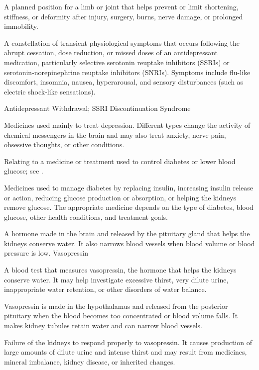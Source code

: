  A planned position for a limb or joint that helps prevent or limit shortening, stiffness, or deformity after injury, surgery, burns, nerve damage, or prolonged immobility.

 A constellation of transient physiological symptoms that occurs following the abrupt cessation, dose reduction, or missed doses of an antidepressant medication, particularly selective serotonin reuptake inhibitors (SSRIs) or serotonin-norepinephrine reuptake inhibitors (SNRIs). Symptoms include flu-like discomfort, insomnia, nausea, hyperarousal, and sensory disturbances (such as electric shock-like sensations).

\synonyms
Antidepressant Withdrawal; SSRI Discontinuation Syndrome

 Medicines used mainly to treat depression. Different types change the activity of chemical messengers in the brain and may also treat anxiety, nerve pain, obsessive thoughts, or other conditions.

 Relating to a medicine or treatment used to control diabetes or lower blood glucose; see .

 Medicines used to manage diabetes by replacing insulin, increasing insulin release or action, reducing glucose production or absorption, or helping the kidneys remove glucose. The appropriate medicine depends on the type of diabetes, blood glucose, other health conditions, and treatment goals.

 A hormone made in the brain and released by the pituitary gland that helps the kidneys conserve water. It also narrows blood vessels when blood volume or blood pressure is low.
\synonyms
Vasopressin

 A blood test that measures vasopressin, the hormone that helps the kidneys conserve water. It may help investigate excessive thirst, very dilute urine, inappropriate water retention, or other disorders of water balance.

 Vasopressin is made in the hypothalamus and released from the posterior pituitary when the blood becomes too concentrated or blood volume falls. It makes kidney tubules retain water and can narrow blood vessels.

 Failure of the kidneys to respond properly to vasopressin. It causes production of large amounts of dilute urine and intense thirst and may result from medicines, mineral imbalance, kidney disease, or inherited changes.


